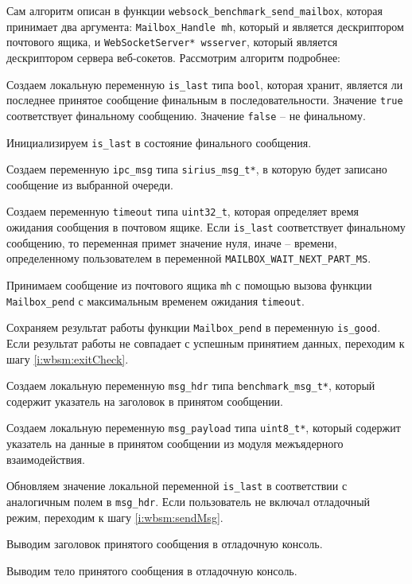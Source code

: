 Сам алгоритм описан в функции \verb|websock_benchmark_send_mailbox|, которая
принимает два аргумента: \verb|Mailbox_Handle mh|, который и является дескриптором
почтового ящика, и \verb|WebSocketServer* wsserver|, который является дескриптором
сервера веб-сокетов. Рассмотрим алгоритм подробнее:
\begin{enumerate_step}
    \item Создаем локальную переменную \verb|is_last| типа \verb|bool|, которая
    хранит, является ли последнее принятое сообщение финальным
    в последовательности. Значение \verb|true| соответствует финальному сообщению.
    Значение \verb|false| -- не финальному.
    \item Инициализируем \verb|is_last| в состояние финального сообщения.
    \item \label{i:wbsm:mainLoopStart} Создаем переменную \verb|ipc_msg| типа
    \verb|sirius_msg_t*|, в которую будет записано сообщение из выбранной
    очереди.
    \item Создаем переменную \verb|timeout| типа \verb|uint32_t|, которая
    определяет время ожидания сообщения в почтовом ящике. Если \verb|is_last|
    соответствует финальному сообщению, то переменная примет значение нуля,
    иначе -- времени, определенному пользователем в переменной
    \verb|MAILBOX_WAIT_NEXT_PART_MS|.
    \item Принимаем сообщение из почтового ящика \verb|mh| с помощью вызова функции
    \verb|Mailbox_pend| с максимальным временем ожидания \verb|timeout|.
    \item Сохраняем результат работы функции \verb|Mailbox_pend| в переменную
    \verb|is_good|. Если результат работы не совпадает с успешным принятием данных,
    переходим к шагу \ref{i:wbsm:exitCheck}.
    \item Создаем локальную переменную \verb|msg_hdr| типа \verb|benchmark_msg_t*|,
    который содержит указатель на заголовок в принятом сообщении.
    \item Создаем локальную переменную \verb|msg_payload| типа \verb|uint8_t*|,
    который содержит указатель на данные в принятом сообщении из модуля межъядерного
    взаимодействия.
    \item Обновляем значение локальной переменной \verb|is_last| в соответствии
    с аналогичным полем в \verb|msg_hdr|.
    Если пользователь не включал отладочный режим, переходим к шагу
    \ref{i:wbsm:sendMsg}.
    \item Выводим заголовок принятого сообщения в отладочную консоль.
    \item Выводим тело принятого сообщения в отладочную консоль.

\end{enumerate_step}
